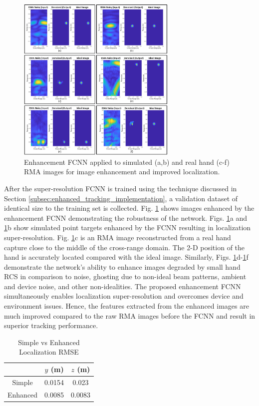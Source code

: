 \documentclass[10pt,journal,final]{IEEEtran}
\begin{document}
\begin{figure}[h]
	\centering
	\includegraphics[width=3in]{fcnn_results.jpg}
	\caption{Enhancement FCNN applied to simulated (a,b) and real hand (c-f) RMA images for image enhancement and improved localization.}
	\label{fig:fcnn_enhancement_demo}
\end{figure}

After the super-resolution FCNN is trained using the technique discussed in Section \ref{subsec:enhanced_tracking_implementation}, a validation dataset of identical size to the training set is collected.
Fig. \ref{fig:fcnn_enhancement_demo} shows images enhanced by the enhancement FCNN demonstrating the robustness of the network. 
Figs. \ref{fig:fcnn_enhancement_demo}a and \ref{fig:fcnn_enhancement_demo}b show simulated point targets enhanced by the FCNN resulting in localization super-resolution. 
Fig. \ref{fig:fcnn_enhancement_demo}c is an RMA image reconstructed from a real hand capture close to the middle of the cross-range domain. 
The 2-D position of the hand is accurately located compared with the ideal image. 
Similarly, Figs. \ref{fig:fcnn_enhancement_demo}d-\ref{fig:fcnn_enhancement_demo}f demonstrate the network's ability to enhance images degraded by small hand RCS in comparison to noise, ghosting due to non-ideal beam patterns, ambient and device noise, and other non-idealities.
The proposed enhancement FCNN simultaneously enables localization super-resolution and overcomes device and environment issues.
Hence, the features extracted from the enhanced images are much improved compared to the raw RMA images before the FCNN and result in superior tracking performance.

\begin{table} [h]
	\caption{Simple vs Enhanced Localization RMSE}
	\centering
	\begin{tabular}{| c || c |  c |}
		\hline
		& $y$ (m) & $z$ (m) \\
		\hline\hline
		Simple & 0.0154 & 0.023 \\ 
		\hline
		Enhanced & 0.0085 & 0.0083 \\ 
		\hline
	\end{tabular}
	\label{table:fcnn_position_rmse}
\end{table}
\end{document}
